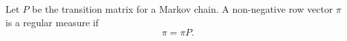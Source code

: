 Let $P$ be the transition matrix for a Markov chain. A non-negative row vector $\pi$ is a regular measure if
$$\pi = \pi P.$$
